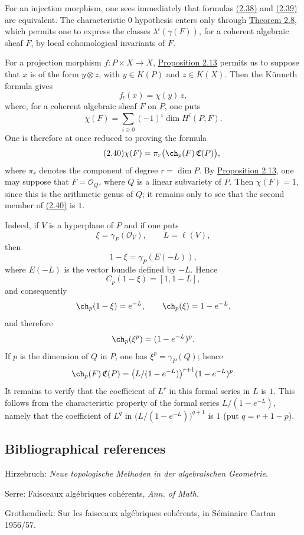 For an injection morphism, one sees immediately that formulas \hyperlink{sga6.e00.eq.2-38}{(2.38)} and \hyperlink{sga6.e00.eq.2-39}{(2.39)} are equivalent. The characteristic \(0\) hypothesis enters only through \hyperlink{sga6.e00.thm.2-8}{Theorem 2.8}, which permits one to express the classes \(\lambda^i(\gamma(F))\), for a coherent algebraic sheaf \(F\), by local cohomological invariants of \(F\).

For a projection morphism \(f:P\times X\to X\), \hyperlink{sga6.e00.prop.2-13}{Proposition 2.13} permits us to suppose that \(x\) is of the form \(y\otimes z\), with \(y\in K(P)\) and \(z\in K(X)\). Then the Künneth formula gives
\[
  f_!(x)=\chi(y)\,z,
\]
where, for a coherent algebraic sheaf \(F\) on \(P\), one puts
\[
  \chi(F)=\sum_{i\geq 0}(-1)^i\dim H^i(P,F).
\]
One is therefore at once reduced to proving the formula
\begin{equation}\tag{2.40}
  \chi(F)=\pi_r\bigl(\ch_p(F)\,\mathfrak C(P)\bigr),
\end{equation}
where \(\pi_r\) denotes the component of degree \(r=\dim P\). By \hyperlink{sga6.e00.prop.2-13}{Proposition 2.13}, one may suppose that \(F=\mathcal O_Q\), where \(Q\) is a linear subvariety of \(P\). Then \(\chi(F)=1\), since this is the arithmetic genus of \(Q\); it remains only to see that the second member of \hyperlink{sga6.e00.eq.2-40}{(2.40)} is \(1\).

Indeed, if \(V\) is a hyperplane of \(P\) and if one puts
\[
  \xi=\gamma_P(\mathcal O_V),\qquad L=\ell(V),
\]
then
\[
  1-\xi=\gamma_P(E(-L)),
\]
where \(E(-L)\) is the vector bundle defined by \(-L\). Hence
\[
  C_p(1-\xi)=[1,1-L],
\]
and consequently
\[
  \ch_p(1-\xi)=e^{-L},\qquad \ch_p(\xi)=1-e^{-L},
\]
and therefore
\[
  \ch_p(\xi^p)=(1-e^{-L})^p.
\]
If \(p\) is the dimension of \(Q\) in \(P\), one has \(\xi^p=\gamma_P(Q)\); hence
\[
  \ch_p(F)\,\mathfrak C(P)
  =
  \bigl(L/(1-e^{-L})\bigr)^{r+1}(1-e^{-L})^p.
\]
It remains to verify that the coefficient of \(L^r\) in this formal series in \(L\) is \(1\). This follows from the characteristic property of the formal series \(L/(1-e^{-L})\), namely that the coefficient of \(L^q\) in \(\bigl(L/(1-e^{-L})\bigr)^{q+1}\) is \(1\) (put \(q=r+1-p\)).

\subsection*{Bibliographical references}
\begin{enumerate}[label={[\arabic*]}]
\item Hirzebruch: \emph{Neue topologische Methoden in der algebraischen Geometrie}.
\item Serre: Faisceaux algébriques cohérents, \emph{Ann. of Math.}
\item Grothendieck: Sur les faisceaux algébriques cohérents, in Séminaire Cartan 1956/57.
\end{enumerate}

